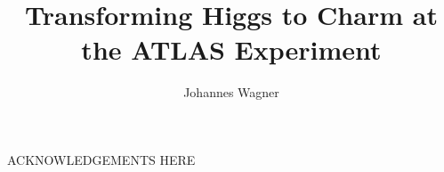 \documentclass{ucbthesis}
\begin{document}

\title{Transforming Higgs to Charm at the ATLAS Experiment}
\author{Johannes Wagner}


\maketitle
\approvalpage
\copyrightpage



\begin{frontmatter}


\tableofcontents
\clearpage
\listoffigures
\clearpage
\listoftables

\begin{acknowledgements}
ACKNOWLEDGEMENTS HERE

\end{acknowledgements}

\end{frontmatter}

\pagestyle{headings}






\end{document}
